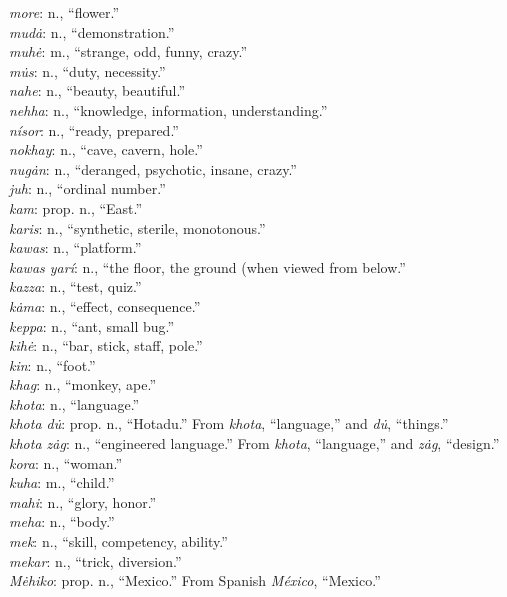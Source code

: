 \documentclass{article}[10pt]
\begin{document}
\begin{multicols}{3}
\emph{more}: n., ``flower.''\\
\emph{mud\.{a}}: n., ``demonstration.''\\
\emph{muh\.{e}}: m., ``strange, odd, funny, crazy.''\\
\emph{m\.{u}s}: n., ``duty, necessity.''\\
\emph{nahe}: n., ``beauty, beautiful.''\\
\emph{nehha}: n., ``knowledge, information, understanding.''\\
\emph{n\'{i}sor}: n., ``ready, prepared.''\\ 
\emph{nokhay}: n., ``cave, cavern, hole.''\\
\emph{nug\.{a}n}: n., ``deranged, psychotic, insane, crazy.''\\
\emph{juh}: n., ``ordinal number.''\\
\emph{kam}: prop. n., ``East.''\\
\emph{karis}: n., ``synthetic, sterile, monotonous.''\\
\emph{kawas}: n., ``platform.''\\
\emph{kawas yar\'{i}}: n., ``the floor, the ground (when viewed from below.''\\
\emph{kazza}: n., ``test, quiz.''\\
\emph{k\.{a}ma}: n., ``effect, consequence.''\\
\emph{keppa}: n., ``ant, small bug.''\\
\emph{kih\.{e}}: n., ``bar, stick, staff, pole.''\\
\emph{kin}: n., ``foot.''\\
\emph{khag}: n., ``monkey, ape.''\\
\emph{khota}: n., ``language.''\\
\emph{khota d\.{u}}: prop. n., ``Hotadu.'' From \emph{khota}, ``language,'' and \emph{d\.{u}}, ``things.''\\
\emph{khota z\.{a}g}: n., ``engineered language.'' From \emph{khota}, ``language,'' and \emph{z\.{a}g}, ``design.''\\
\emph{kora}: n., ``woman.''\\
\emph{kuha}: m., ``child.''\\
\emph{mahi}: n., ``glory, honor.''\\
\emph{meha}: n., ``body.''\\
\emph{mek}: n., ``skill, competency, ability.''\\
\emph{mekar}: n., ``trick, diversion.''\\
\emph{M\.{e}hiko}: prop. n., ``Mexico.'' From Spanish \emph{M\'{e}xico}, ``Mexico.''\\

\end{multicols}
\end{document}
